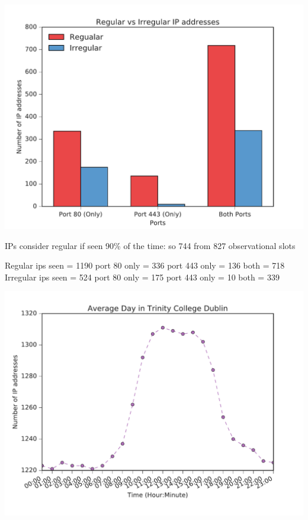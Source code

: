 \documentclass[a4wide,leqno,12pt]{report}
\begin{document}
\begin{center}
\includegraphics[scale=.5]{pdf_images/RegularVsIrregularIPaddresses}
\end{center}
IPs consider regular if seen 90\% of the time: so 744 from 827 observational slots

Regular ips seen = 1190
    port 80 only  = 336
    port 443 only  = 136
    both  = 718
Irregular ips seen = 524
    port 80 only  = 175
    port 443 only  = 10
    both  = 339


\begin{center}
\includegraphics[scale=.5]{pdf_images/AverageDayinTrinityCollegeDublin}
\end{center}
\end{document}
